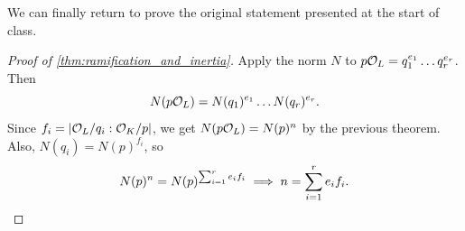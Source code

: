 We can finally return to prove the original statement presented at the start of class.
\begin{proof}[Proof of \ref{thm:ramification_and_inertia}]
    Apply the norm $N$ to $p \mathcal O_L = q_1^{e_1} \dots q_r^{e_r}$. Then
    \[ N(p \mathcal O_L) = N(q_1)^{e_1} \dots N(q_r)^{e_r}. \]
    Since $f_i = \left\lvert \mathcal O_L/q_i : \mathcal O_K/p \right\rvert$, we get $N(p \mathcal O_L) = N(p)^n$ by the previous theorem. Also, $N(q_i) = N(p)^{f_i}$, so
    \[ N(p)^n = N(p)^{\sum_{i=1}^r e_i f_i} \implies n = \sum_{i=1}^r e_i f_i. \qedhere \]
\end{proof}



